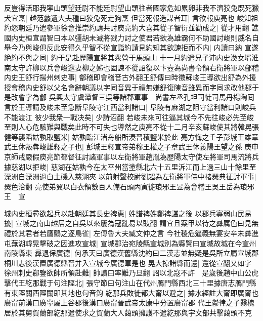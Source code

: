 反豈得活耶我寜山頭望廷尉不能廷尉望山頭往者國家危如累卵非我不濟狡兔既死獵犬宜烹|{
	越范蠡遺大夫種曰狡兔死走狗烹}
但當死報造謀者耳|{
	言欲報庾亮也}
峻知祖約怨朝廷乃遣參軍徐會推崇約請共討庾亮約大喜其從子智衍並勸成之|{
	從才用翻}
譙國内史桓宣謂智曰本以彊胡未滅將戮力討之使君若欲為雄霸何不助國討峻則威名自舉今乃與峻俱反此安得久乎智不從宣詣約請見約知其欲諫拒而不内|{
	内讀曰納}
宣遂絶約不與之同|{
	約于是赴歷陽宣將其衆營于馬頭山}
十一月約遣兄子沛内史渙女壻淮南太守許柳以兵會峻逖妻柳之姊也固諫不從詔復以卞壼為尚書令領右衛將軍以鄶稽内史王舒行揚州刺史事|{
	鄶稽即會稽音古外翻王舒傳曰時徵蘇峻王導欲出舒為外援授會稽内史舒以父名會辭朝議以字同音異于禮無嫌舒復陳音雖異而字同求改他郡于是改會字為鄶}
吳興太守虞潭督三吳等諸郡軍事　尚書左丞孔坦司徒司馬丹楊陶囘言於王導請及峻未至急斷阜陵守江西當利諸口|{
	阜陵有麻湖之阻守當利諸口則峻兵不能渡江}
彼少我衆一戰决矣|{
	少詩沼翻}
若峻未來可往逼其城今不先往峻必先至峻至則人心危駭難與戰矣此時不可失也導然之庾亮不從十二月辛亥蘇峻使其將韓晃張健等襲䧟姑孰取鹽米|{
	姑孰臨江渚舟船所湊晉積鹽米於此}
亮方悔之壬子彭城王雄章武王休叛犇峻雄釋之子也|{
	彭城王釋宣帝弟穆王權之子章武王休義陽王望之孫}
庚申京師戒嚴假庾亮節都督征討諸軍事以左衛將軍趙胤為歷陽太守使左將軍司馬流將兵據慈湖以拒峻|{
	慈湖在姑孰今在太平州當塗縣北六十五里泝江而上過三山十餘里至溧洲自溧洲過白土磯入慈湖夾}
以前射聲校尉劉超為左衛將軍侍中禇翜典征討軍事|{
	翜色洽翻}
亮使弟翼以白衣領數百人備石頭丙寅徙琅邪王昱為會稽王吳王岳為琅邪王　宣

城内史桓彛欲起兵以赴朝廷其長史禆惠|{
	姓譜禆姓鄭禆諶之後}
以郡兵寡弱山民易擾|{
	宣城之南山越居之自吳以來屢為寇亂易以豉翻}
謂宜且案甲以待之彛厲色曰見無禮於其君者若鷹鸇之逐鳥雀|{
	左傳魯大夫臧文仲之言}
今社稷危逼義無宴安辛未彛進屯蕪湖韓晃擊破之因進攻宣城|{
	宣城郡治宛陵縣宣城别為縣賢曰宣城故城在今宣州南陵縣東}
彛退保廣德|{
	何承天曰廣德漢舊縣沈約曰二漢志並無疑是吳所立屬宣城郡桐川志後漢置廣德縣晉并入宣城今廣德軍是也}
晃大掠諸縣而還|{
	還從宣翻又如字}
徐州刺史郗鑒欲帥所領赴難|{
	帥讀曰率難乃旦翻}
詔以北寇不許　是歲後趙中山公虎擊代王紇那戰于句注陘北|{
	張守節曰句注山在代州鴈門縣西北三十里據唐志鴈門縣有東陘關西陘關即其地也句音鉤}
紇那兵敗徙都大甯以避之|{
	據水經註大甯即廣甯也廣甯前漢曰廣寜屬上谷郡後漢曰廣甯晉武帝太康中分置廣甯郡}
代王鬱律之子翳槐居於其舅賀蘭部紇那遣使求之賀蘭大人藹頭擁護不遣紇那與宇文部共擊藹頭不克

